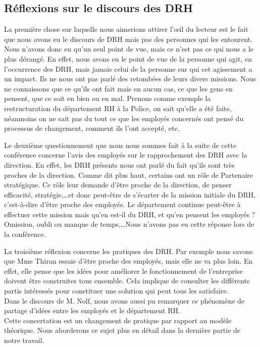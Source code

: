 \subsection{Réflexions sur le discours des DRH}

La première chose sur laquelle nous aimerions attirer l'œil du lecteur est le fait que nous avons eu le discours de DRH mais pas des personnes qui les entourent. Nous n'avons donc eu qu'un seul point de vue, mais ce n'est pas ce qui nous a le plus dérangé. En effet, nous avons eu le point de vue de la personne qui agit, en l'occurrence des DRH, mais jamais celui de la personne sur qui cet agissement a un impact. Ils ne nous ont pas parlé des retombées de leurs divers missions. Nous ne connaissons que ce qu'ils ont fait mais en aucun cas, ce que les gens en pensent, que ce soit en bien ou en mal. Prenons comme exemple la restructuration du département RH à la Police, on sait qu'elle a été faite, néanmoins on ne sait pas du tout ce que les employés concernés ont pensé du processus de changement, comment ils l'ont accepté, etc. \newline 

Le deuxième questionnement que nous nous sommes fait à la suite de cette conférence concerne l'avis des employés sur le rapprochement des DRH avec la direction. En effet, les DRH présents nous ont parlé du fait qu'ils sont très proches de la direction. Comme dit plus haut, certains ont un rôle de \og{}Partenaire stratégique\fg{}. Ce rôle leur demande d'être proche de la direction, de penser efficacité, stratégie,\ldots et donc peut-être de s'écarter de la mission initiale du DRH, c'est-à-dire d'être proche des employés.
 Le département continue peut-être à effectuer cette mission mais qu'en est-il du DRH, et qu'en pensent les employés ? Omission, oubli ou manque de temps,\ldots Nous n'avons pas eu cette réponse lors de la conférence. \newline

La troisième réflexion concerne les pratiques des DRH. Par exemple nous savons que Mme Thiran essaie d'être proche des employés, mais elle ne va plus loin. En effet, elle pense que les idées pour améliorer le fonctionnement de l'entreprise doivent être construites tous ensemble. Cela implique de consulter les différents partis intéressés pour constituer une solution qui peut tous les satisfaire. \\
Dans le discours de M. Nolf, nous avons aussi pu remarquer ce phénomène de partage d'idées entre les employés et le département RH.\\
Cette concertation est un changement de pratique par rapport au modèle théorique. Nous aborderons ce sujet plus en détail dans la dernière partie de notre travail.\newline

